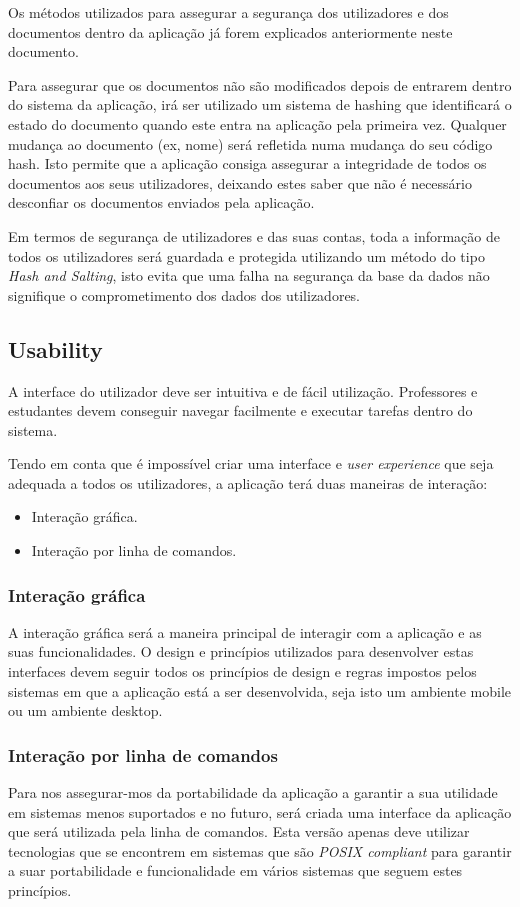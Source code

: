 \documentclass[10pt]{article}
\begin{document}
Os métodos utilizados para assegurar a segurança dos utilizadores e dos documentos dentro da aplicação já forem explicados
anteriormente neste documento.

Para assegurar que os documentos não são modificados depois de entrarem dentro do sistema da aplicação, irá ser
utilizado um sistema de hashing que identificará o estado do documento quando este entra na aplicação pela primeira
vez. Qualquer mudança ao documento (ex, nome) será refletida numa mudança do seu código hash. Isto permite que a
aplicação consiga assegurar a integridade de todos os documentos aos seus utilizadores, deixando estes saber que
não é necessário desconfiar os documentos enviados pela aplicação.

Em termos de segurança de utilizadores e das suas contas, toda a informação de todos os utilizadores será
guardada e protegida utilizando um método do tipo \textit{Hash and Salting}, isto evita que uma falha na
segurança da base da dados não signifique o comprometimento dos dados dos utilizadores.

\subsection{Usability}
A interface do utilizador deve ser intuitiva e de fácil utilização.
Professores e estudantes devem conseguir navegar facilmente e executar tarefas dentro do sistema.

Tendo em conta que é impossível criar uma interface e \textit{user experience} que seja adequada a todos os
utilizadores, a aplicação terá duas maneiras de interação:
\begin{itemize}
    \item Interação gráfica.
    \item Interação por linha de comandos.
\end{itemize}

\subsubsection{Interação gráfica}
A interação gráfica será a maneira principal de interagir com a aplicação e as suas funcionalidades. O design e princípios
utilizados para desenvolver estas interfaces devem seguir todos os princípios de design e regras impostos pelos sistemas
em que a aplicação está a ser desenvolvida, seja isto um ambiente mobile ou um ambiente desktop.

\subsubsection{Interação por linha de comandos}
Para nos assegurar-mos da portabilidade da aplicação a garantir a sua utilidade em sistemas menos suportados e no futuro,
será criada uma interface da aplicação que será utilizada pela linha de comandos.
Esta versão apenas deve utilizar tecnologias que se encontrem em sistemas que são \textit{POSIX compliant} para
garantir a suar portabilidade e funcionalidade em vários sistemas que seguem estes princípios.
\end{document}
